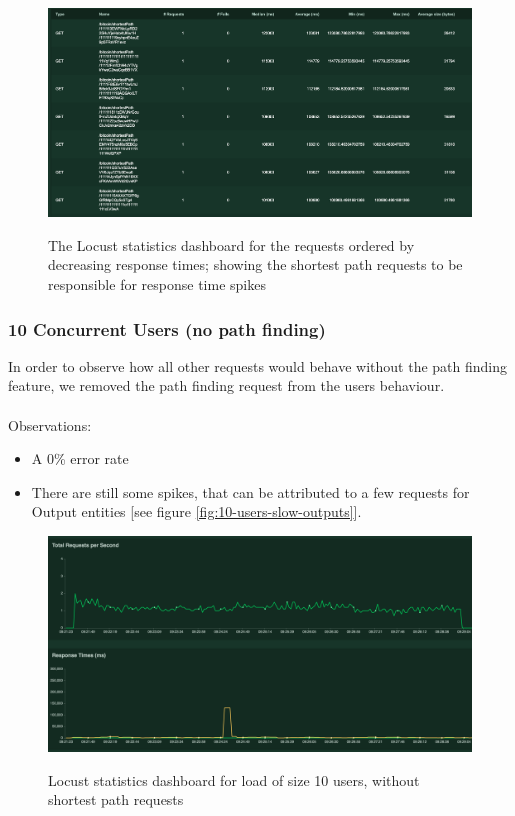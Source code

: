 \begin{figure}[h!]
  \centering
  \includegraphics[width = 15cm]{./figures/100-users-shortestpath}\\[0.5cm]
  \caption{The Locust statistics dashboard for the requests ordered by decreasing response times; showing the shortest path requests to be responsible for response time spikes}
  \label{fig:100-users-path-finding-latencies}
\end{figure}

\subsubsection{10 Concurrent Users (no path finding)}
In order to observe how all other requests would behave without the path finding feature, we removed the path finding request from the users behaviour. 
\\\\
Observations:
\begin{itemize}
    \item A 0\% error rate
    \item There are still some spikes, that can be attributed to a few requests for Output entities [see figure \ref{fig:10-users-slow-outputs}]. 
\end{itemize}

\begin{figure}
  \centering
  \includegraphics[width = 22cm]{./figures/10-users-no-path-locust}\\[0.5cm] 
  \caption{Locust statistics dashboard for load of size 10 users, without shortest path requests}
  \label{fig:10-users-stats-dashboard-no-path-finding}
\end{figure}


